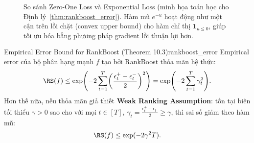 \begin{figure}[H]
    \centering
    \caption{So sánh Zero-One Loss và Exponential Loss (minh họa toán học cho Định lý~\ref{thm:rankboost_error}). Hàm mũ $e^{-u}$ hoạt động như một cận trên lồi chặt (convex upper bound) cho hàm chỉ thị $\mathbf{1}_{u \leq 0}$, giúp tối ưu hóa bằng phương pháp gradient lồi thuận lợi hơn.}
    \label{fig:loss_comparison}
\end{figure}

\begin{theorem}{Empirical Error Bound for RankBoost (Theorem 10.3)}{rankboost_error}
Empirical error của bộ phân hạng mạnh $f$ tạo bởi RankBoost thỏa mãn hệ thức:
\begin{equation}
    \RS(f) \leq \exp\Biggl(-2 \sum_{t=1}^T \biggl(\frac{\epsilon^+_t - \epsilon^-_t}{2}\biggr)^2\Biggr) = \exp\Biggl(-2 \sum_{t=1}^T \gamma_t^2\Biggr).
    \label{eq:rankboost_bound}
\end{equation}
Hơn thế nữa, nếu thỏa mãn giả thiết \textbf{Weak Ranking Assumption}: tồn tại biên tối thiểu $\gamma > 0$ sao cho với mọi $t \in [T]$, $\gamma_t = \frac{\epsilon^+_t - \epsilon^-_t}{2} \geq \gamma$, thì sai số giảm theo hàm mũ:
\begin{equation}
    \RS(f) \leq \exp(-2\gamma^2 T).
    \label{eq:rankboost_exp_bound}
\end{equation}
\end{theorem}

